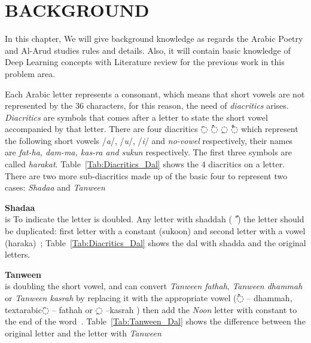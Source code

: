 
\chapter{\uppercase{Background}}\label{Ch:Background}
In this chapter, We will give background knowledge as regards the Arabic Poetry and Al-Arud studies
rules and details. Also, it will contain basic knowledge of Deep Learning concepts with Literature
review for the previous work in this problem area.

Each Arabic letter represents a consonant, which means that short vowels are not
represented by the 36 characters, for this reason, the need of \textit{diacritics}
arises. \textit{Diacritics} are symbols that comes after a letter to state the
short vowel accompanied by that letter. There are four diacritics \textarabic{◌َ} \textarabic{◌ُ}
\textarabic{◌ِ} \textarabic{◌ْ} which represent the following short vowels
/\textit{a}/, /\textit{u}/, /\textit{i}/ and \textit{no-vowel} respectively,
their names are \textit{fat-ha, dam-ma, kas-ra and sukun} respectively.  The first
three symbols are called \textit{harakat}. Table~\ref{Tab:Diacritics_Dal}
shows the 4 diacritics on a letter.
There are two more sub-diacritics made up of the basic four to represent two
cases: \textit{Shadaa} and \textit{Tanween}%
\begin{definition}\label{def:shadaa_definition}
  \textbf{Shadaa}  \hfill \\
  is To indicate the letter is doubled. Any letter with shaddah (\textarabic{ ّ }) the letter should be duplicated: first letter with a constant (sukoon) and second letter with a vowel (haraka)~\cite{Alnagdawi2013}; Table~\ref{Tab:Diacritics_Dal} shows the dal with shadda and the original letters.%
\end{definition}
\begin{definition}\label{def:tanween_definition}
  \textbf{Tanween} \hfill \\
  is doubling the short vowel, and can convert \textit{Tanween fathah}, \textit{Tanween dhammah} or \textit{Tanween kasrah} by replacing it with the appropriate vowel (\textarabic{◌ُ} – dhammah, textarabic{◌َ} – fathah or \textarabic{◌ِ} –kasrah ) then add the \textit{Noon} letter with constant to the end of the word~\cite{Alnagdawi2013}. Table~\ref{Tab:Tanween_Dal}
  shows the difference between the original letter and the letter with \textit{Tanween}%
\end{definition}%


